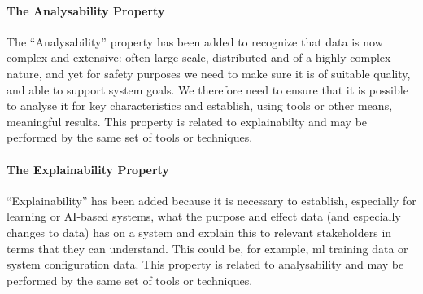 \paragraph{The Analysability Property}\label{bkm:guidance:analysability}
The ``Analysability'' property has been added to recognize that data is now complex and extensive: often large scale, distributed and of a highly complex nature, and yet for safety purposes we need to make sure it is of suitable quality, and able to support system goals.
We therefore need to ensure that it is possible to analyse it for key characteristics and establish, using tools or other means, meaningful results. This property is related to explainabilty and may be performed by the same set of tools or techniques.

\paragraph{The Explainability Property}\label{bkm:guidance:explainability}
``Explainability'' has been added because it is necessary to establish, especially for learning or AI-based systems,
what the purpose and effect data (and especially changes to data) has on a system
and explain this to relevant stakeholders in terms that they can understand.
This could be, for example, \gls{ml} training data or system \gls{configuration data}.
This property is related to analysability and may be performed by the same set of tools or techniques.
%
\clearpage
